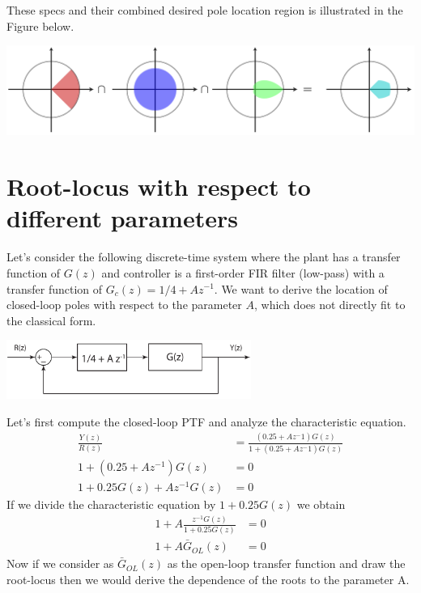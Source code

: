 \documentclass[twoside]{article}
\begin{document}
These specs and their combined desired pole location region is
illustrated in the Figure below.

\begin{center}
\begin{minipage}[h]{\linewidth}
    \begin{center}
      \includegraphics[width=\textwidth]{region}
    \end{center}
\end{minipage}
\end{center}

\newpage

\section*{Root-locus with respect to different parameters}

Let's consider the following discrete-time system where the plant has a 
transfer function of $G(z)$ and controller is a first-order FIR filter
(low-pass) with a transfer function of  $G_c(z) = 1/4 + A z^{-1}$.
We want to derive the location of closed-loop poles with respect to 
the parameter $A$, which does not directly fit to the classical form. 

\begin{center}
\begin{minipage}[h]{\linewidth}
    \begin{center}
      \includegraphics[width=0.6\textwidth]{distdiff}
    \end{center}
\end{minipage}
\end{center}

Let's first compute the closed-loop PTF and analyze the characteristic
equation.
%
\begin{align*}
  \frac{Y(z)}{R(z)} &= \frac{ \left(0.25 + A z^-1 \right) G(z) }{1 +
                      \left (0.25 + A z^-1 \right) G(z)} 
\\
1 + \left( 0.25 + A z^{-1} \right) G(z) &= 0
\\
1 + 0.25 G(z) + A z^{-1} G(z) &= 0
\end{align*}
%
If we divide the characteristic equation by $1 + 0.25 G(z)$ we obtain
%
\begin{align*}
1+ A \frac{z^{-1} G(z)}{1 + 0.25 G(z)} &= 0
\\
1+ A \bar{G}_{OL}(z) &= 0
\end{align*}
%
Now if we consider as $\bar{G}_{OL}(z)$ as the open-loop transfer
function and draw the root-locus then we would derive the dependence 
of the roots to the parameter A. 
\end{document}
